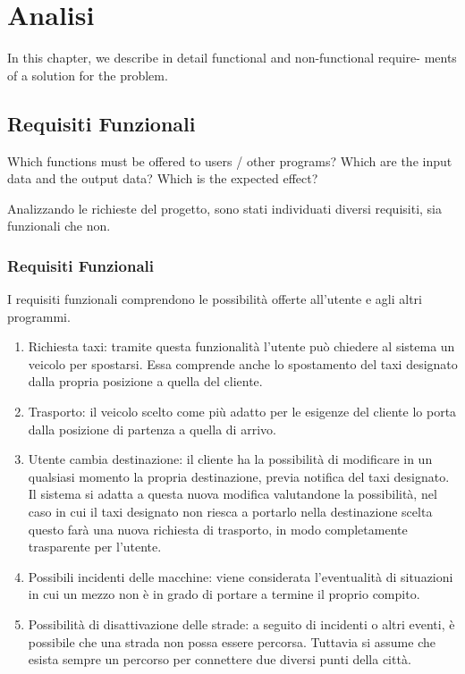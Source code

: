 
\chapter{Analisi}
In this chapter, we describe in detail functional and non-functional require-
ments of a solution for the problem.

\section{Requisiti Funzionali}\label{diocane}
Which functions must be offered to users / other programs? Which are the input data and the output data? Which is the expected effect?

Analizzando le richieste del progetto, sono stati individuati diversi requisiti, sia funzionali che non.
\subsection{Requisiti Funzionali}

I requisiti funzionali comprendono le possibilità offerte all'utente e agli altri programmi.

\begin{enumerate}
	\item Richiesta taxi: tramite questa funzionalità l'utente può chiedere al sistema un veicolo per spostarsi. Essa comprende anche lo spostamento del taxi designato dalla propria posizione a quella del cliente.
	\item Trasporto: il veicolo scelto come più adatto per le esigenze del cliente lo porta dalla posizione di partenza a quella di arrivo.
	\item Utente cambia destinazione: il cliente ha la possibilità di modificare in un qualsiasi momento la propria destinazione, previa notifica del taxi designato. Il sistema si adatta a questa nuova modifica valutandone la possibilità, nel caso in cui il taxi designato non riesca a portarlo nella destinazione scelta questo farà una nuova richiesta di trasporto, in modo completamente trasparente per l'utente.
	\item Possibili incidenti delle macchine: viene considerata l'eventualità di situazioni in cui un mezzo non è in grado di portare a termine il proprio compito.
	\item Possibilità di disattivazione delle strade: a seguito di incidenti o altri eventi, è possibile che una strada non possa essere percorsa. Tuttavia si assume che esista sempre un percorso per connettere due diversi punti della città.
\end{enumerate}

